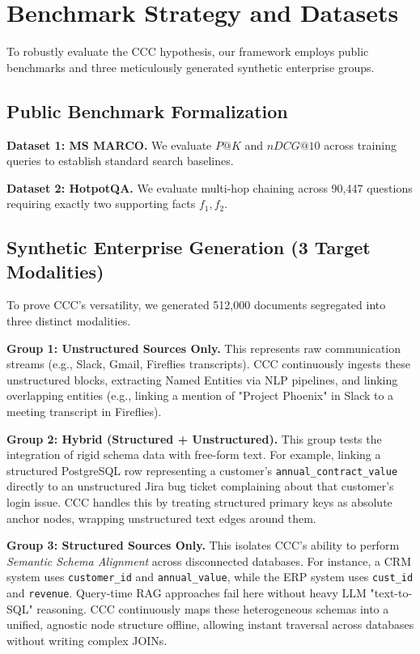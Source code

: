 
\section{Benchmark Strategy and Datasets}
\label{sec:benchmark}
To robustly evaluate the CCC hypothesis, our framework employs public benchmarks and three meticulously generated synthetic enterprise groups.

\subsection{Public Benchmark Formalization}
\textbf{Dataset 1: MS MARCO.} We evaluate $P@K$ and $nDCG@10$ across training queries to establish standard search baselines.

\textbf{Dataset 2: HotpotQA.} We evaluate multi-hop chaining across 90,447 questions requiring exactly two supporting facts $f_1, f_2$. 

\subsection{Synthetic Enterprise Generation (3 Target Modalities)}
To prove CCC's versatility, we generated 512,000 documents segregated into three distinct modalities.

\textbf{Group 1: Unstructured Sources Only.} 
This represents raw communication streams (e.g., Slack, Gmail, Fireflies transcripts). CCC continuously ingests these unstructured blocks, extracting Named Entities via NLP pipelines, and linking overlapping entities (e.g., linking a mention of "Project Phoenix" in Slack to a meeting transcript in Fireflies).

\textbf{Group 2: Hybrid (Structured + Unstructured).} 
This group tests the integration of rigid schema data with free-form text. For example, linking a structured PostgreSQL row representing a customer's \texttt{annual\_contract\_value} directly to an unstructured Jira bug ticket complaining about that customer's login issue. CCC handles this by treating structured primary keys as absolute anchor nodes, wrapping unstructured text edges around them.

\textbf{Group 3: Structured Sources Only.} 
This isolates CCC's ability to perform \textit{Semantic Schema Alignment} across disconnected databases. 
For instance, a CRM system uses \texttt{customer\_id} and \texttt{annual\_value}, while the ERP system uses \texttt{cust\_id} and \texttt{revenue}. Query-time RAG approaches fail here without heavy LLM "text-to-SQL" reasoning. CCC continuously maps these heterogeneous schemas into a unified, agnostic node structure offline, allowing instant traversal across databases without writing complex JOINs.
